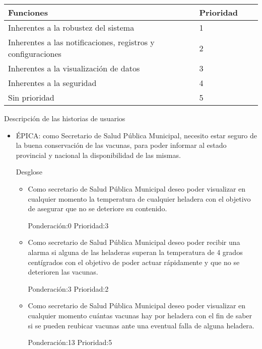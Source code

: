 \documentclass[11pt]{proyecto}
\begin{document}
\begin{table}[ht]
\begin{tabularx}{\linewidth}{@{}|l|X|X|l|@{}}
\hline
\rowcolor[HTML]{C0C0C0}
Funciones           & Prioridad 	\\ \hline
Inherentes a la robustez del sistema & 1 \\ \hline
Inherentes a las notificaciones, registros y configuraciones& 2 \\ \hline
Inherentes a la visualización de datos &3 \\ \hline
Inherentes a la seguridad & 4 \\ \hline
Sin prioridad & 5 \\ \hline
\end{tabularx}
\end{table}

Descripción de las historias de usuarios


\begin{itemize}
\item ÉPICA: como Secretario de Salud Pública Municipal, necesito estar seguro de la buena conservación de las vacunas, para poder informar al estado provincial y nacional la disponibilidad de las mismas.

Desglose
	\begin{itemize}
	\item 
    Como secretario de Salud Pública Municipal deseo poder visualizar en cualquier momento la temperatura de cualquier heladera con el objetivo de asegurar que no se deteriore su contenido. 
    
Ponderación:0 Prioridad:3
	\end{itemize}
	
	\begin{itemize}
	\item 
	Como secretario de Salud Pública Municipal deseo poder recibir una alarma si alguna de las heladeras superan la temperatura de 4 grados centígrados con el objetivo de poder actuar rápidamente y que no se deterioren las vacunas. 
	
Ponderación:3 Prioridad:2
	\end{itemize}

	\begin{itemize}
	\item 
	Como secretario de Salud Pública Municipal deseo poder visualizar en cualquier momento cuántas vacunas hay por heladera con el fin de saber si se pueden reubicar vacunas ante una eventual falla de alguna heladera. 

Ponderación:13 Prioridad:5
	\end{itemize}
\end{itemize}
\end{document}
